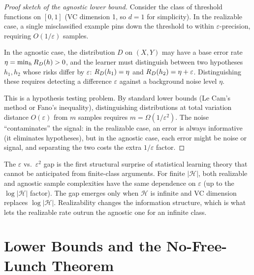 \begin{proof}[Proof sketch of the agnostic lower bound]
Consider the class of threshold functions on $[0,1]$ (VC dimension 1, so
$d = 1$ for simplicity).  In the realizable case, a single misclassified
example pins down the threshold to within $\varepsilon$-precision, requiring
$O(1/\varepsilon)$ samples.

In the agnostic case, the distribution $D$ on $(X, Y)$ may have a base error
rate $\eta = \min_h R_D(h) > 0$, and the learner must distinguish between
two hypotheses $h_1, h_2$ whose risks differ by $\varepsilon$: $R_D(h_1) =
\eta$ and $R_D(h_2) = \eta + \varepsilon$.  Distinguishing these requires
detecting a difference $\varepsilon$ against a background noise level $\eta$.

This is a hypothesis testing problem.  By standard lower bounds (Le Cam's
method or Fano's inequality), distinguishing distributions at total variation
distance $O(\varepsilon)$ from $m$ samples requires
$m = \Omega(1/\varepsilon^2)$.  The noise ``contaminates'' the signal: in the
realizable case, an error is always informative (it eliminates hypotheses),
but in the agnostic case, each error might be noise or signal, and separating
the two costs the extra $1/\varepsilon$ factor.
\end{proof}

\begin{remark}
\label{rmk:revelation}
The $\varepsilon$ vs.\ $\varepsilon^2$ gap is the first structural surprise of
statistical learning theory that cannot be anticipated from finite-class
arguments.  For finite $|\mathcal{H}|$, both realizable and agnostic sample
complexities have the same dependence on $\varepsilon$ (up to the
$\log|\mathcal{H}|$ factor).  The gap emerges only when $\mathcal{H}$ is
infinite and VC dimension replaces $\log|\mathcal{H}|$.  Realizability changes
the information structure, which is what lets the realizable rate outrun the
agnostic one for an infinite class.
\end{remark}



\section{Lower Bounds and the No-Free-Lunch Theorem}
\label{sec:lower-bounds}


